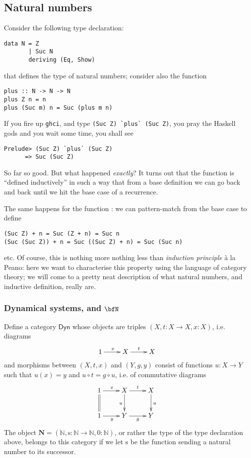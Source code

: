 \documentclass[11pt]{article}
\begin{document}
\subsection{Natural numbers}


Consider the following type declaration:
\begin{verbatim}
data N = Z
       | Suc N
       deriving (Eq, Show)
\end{verbatim}
that defines the type of natural numbers; consider also the  function
\begin{verbatim}
plus :: N -> N -> N
plus Z n = n
plus (Suc m) n = Suc (plus m n)
\end{verbatim}
If you fire up \verb|ghci|, and type \verb|(Suc Z) `plus` (Suc Z)|, you pray the Haskell gods and you wait some time, you shall see
\begin{verbatim}
Prelude> (Suc Z) `plus` (Suc Z)
      => Suc (Suc Z)
\end{verbatim}
So far so good. But what happened \emph{exactly}? It turns out that the function  is ``defined inductively'' in such a way that from a base definition we can go back and back until we hit the base case of a recurrence.

The same happens for the function : we can pattern-match from the base case  to define
\begin{verbatim}
(Suc Z) + n = Suc (Z + n) = Suc n
(Suc (Suc Z)) + n = Suc ((Suc Z) + n) = Suc (Suc n)
\end{verbatim}
etc. Of course, this is nothing more nothing less than \emph{induction principle} à la Peano: here we want to characterise this property using the language of category theory; we will come to a pretty neat description of what natural numbers, and inductive definition, really are.
\subsubsection{Dynamical systems, and \(\bfN\)}

Define a category \(\textsf{Dyn}\) whose objects are triples \((X, t : X \to X,x : X)\), i.e. diagrams
\[
	\xymatrix{
		1 \ar[r]^x & X \ar[r]^t & X
	}
\]
and morphisms between \((X,t,x)\) and \((Y,g,y)\) consist of functions \(u : X \to Y\) such that \(u(x)=y\) and \(u\circ t=g\circ u\), i.e. of commutative diagrams
\[
	\xymatrix{
		1 \ar[r]^x\ar@{=}[d] & X\ar[r]^t\ar[d]_u & X \ar[d]^u \\
		1 \ar[r]_y & Y \ar[r]_g & Y
	}
\]
The object \(\mathbf{N}=(\mathbb{N}, \text{s} : \mathbb N \to \mathbb N, 0 : \mathbb N)\), or rather the type  of the type declaration above, belongs to this category if we let \(\text{s}\) be the function  sending a natural number to its successor.
\end{document}
